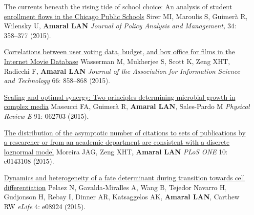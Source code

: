 \NumberedItem{\makebox[0.8cm][r]{[112]}}
\href{/people/amaral/currents-beneath-rising-tide-school-choice-analysis-student-enrollment-flows-chicago-public-schools}
{The currents beneath the rising tide of school choice: An analysis of student enrollment flows in the Chicago Public Schools}
\newline
Sirer MI, Maroulis S, Guimer\`a R, Wilensky U, {\textbf{Amaral LAN}}
\newline
\textit{Journal of Policy Analysis and Management,}
    34:
358--377 (2015).
\newline
\Gap
~
\Gap

\NumberedItem{\makebox[0.8cm][r]{[111]}}
\href{/people/amaral/correlations-between-user-voting-data-budget-and-box-office-films-internet-movie-database}
{Correlations between user voting data, budget, and box office for films in the Internet Movie Database}
\newline
Wasserman M, Mukherjee S, Scott K, Zeng XHT, Radicchi F, {\textbf{Amaral LAN}}
\newline
\textit{Journal of the Association for Information Science and Technology}
    66:
858--868 (2015).
\newline
\Gap
~
\Gap

\NumberedItem{\makebox[0.8cm][r]{[110]}}
\href{/people/amaral/scaling-and-optimal-synergy-two-principles-determining-microbial-growth-complex-media}
{Scaling and optimal synergy: Two principles determining microbial growth in complex media}
\newline
Massucci FA, Guimer\`a R, {\textbf{Amaral LAN}}, Sales-Pardo M
\newline
\textit{Physical Review E}
    91:
062703 (2015).
\newline
\Gap
~
\Gap

\NumberedItem{\makebox[0.8cm][r]{[109]}}
\href{/people/amaral/distribution-asymptotic-number-citations-sets-publications-researcher-or-academic-department-are-consistent-discrete-lognormal-model}
{The distribution of the asymptotic number of citations to sets of  publications by a researcher or from an academic department are consistent with a discrete lognormal model}
\newline
Moreira JAG, Zeng XHT, {\textbf{Amaral LAN}}
\newline
\textit{PLoS ONE}
    10:
e0143108 (2015).
\newline
\Gap
~
\Gap

\NumberedItem{\makebox[0.8cm][r]{[108]}}
\href{/people/amaral/dynamics-and-heterogeneity-fate-determinant-during-transition-towards-cell-differentiation}
{Dynamics and heterogeneity of a fate determinant during transition towards cell differentiation}
\newline
Pelaez N, Gavalda-Miralles A, Wang B, Tejedor Navarro H, Gudjonson H, Rebay I, Dinner AR, Katsaggelos AK, {\textbf{Amaral LAN}}, Carthew RW
\newline
\textit{eLife}
    4:
e08924 (2015).
\newline
\Gap
~
\Gap

